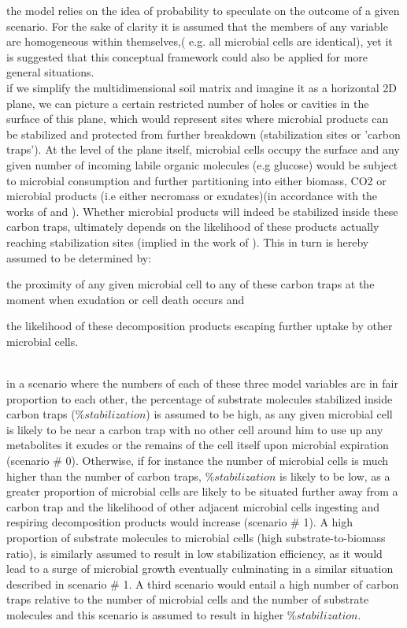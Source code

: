 	the model relies on the idea of probability to speculate on the outcome of a given scenario.
	For the sake of clarity it is assumed that the members of any variable are homogeneous within themselves,( e.g. all microbial cells are identical), yet it is suggested that this conceptual framework could also be applied for more general situations.\\
	if we simplify the multidimensional soil matrix and imagine it as a horizontal 2D plane, we can picture a certain restricted number of holes or cavities in the surface of this plane, which would represent sites where microbial products can be stabilized and protected from further breakdown (stabilization sites or 'carbon traps'). At the level of the plane itself, microbial cells occupy the surface and any given number of incoming labile organic molecules (e.g glucose) would be subject to microbial consumption and further partitioning into either biomass, CO2 or microbial products (i.e either necromass or exudates)(in accordance with the works of \citeauthor{fischer2010} and \citeauthor{gunina2014}). Whether microbial products will indeed be stabilized inside these carbon traps, ultimately depends on the likelihood of these products actually reaching stabilization sites (implied in the work of \citeauthor{kravchenko2015}). This in turn is hereby assumed to be determined by:
	\begin{enumerate*}[label=(\arabic*)]
		\item the proximity of any given microbial cell to any of these carbon traps at the moment when exudation or cell death occurs and
		\item the likelihood of these decomposition products escaping further uptake by other microbial cells.
	\end{enumerate*}\\
	 in a scenario where the numbers of each of these three model variables are in fair proportion to each other, the percentage of substrate molecules stabilized inside carbon traps ($ \%stabilization $) is assumed to be high, as any given microbial cell is likely to be near a carbon trap with no other cell around him to use up any metabolites it exudes or the remains of the cell itself upon microbial expiration (scenario \# 0). Otherwise, if for instance the number of microbial cells is much higher than the number of carbon traps, $ \%stabilization  $ is likely to be low, as a greater proportion of microbial cells are likely to be situated further away from a carbon trap and the likelihood of other adjacent microbial cells ingesting and respiring decomposition products would increase (scenario \# 1). A high proportion of substrate molecules to microbial cells (high substrate-to-biomass ratio),  is similarly assumed to result in low stabilization efficiency, as it would lead to a surge  of microbial growth eventually culminating in a similar situation described in scenario \# 1. A third scenario would entail a high number of carbon traps relative to the number of microbial cells and the number of substrate molecules and this scenario is assumed to result in higher $ \%stabilization $.\\
